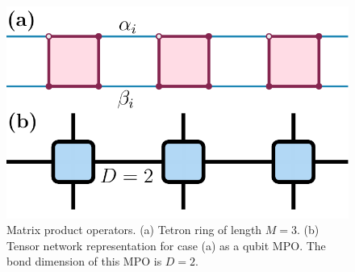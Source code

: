 \documentclass[twocolumn,floats,prx,showpacs]{revtex4-1}
\begin{document}
\begin{figure}
\includegraphics[width=0.62\columnwidth]{fig/MPO.pdf}
\caption{Matrix product operators. (a) Tetron ring of length $M=3$.  (b) Tensor network representation for case (a) as a qubit MPO. The bond dimension of this MPO is $D=2$. }
\label{fig:mpo}
\end{figure}
\end{document}
